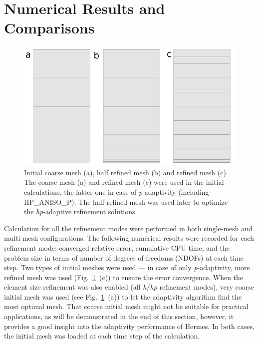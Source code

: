 \section{Numerical Results and Comparisons}\label{sec:results}

\begin{figure}[!ht]
  \begin{centering}
  \includegraphics[width=.8\columnwidth]{mesh}
  \caption{\label{fig:mesh} Initial coarse mesh (a),
  	half refined mesh (b) and refined mesh (c). The coarse mesh (a)
	and refined mesh (c) were used in the initial calculations, the latter one
	in case of \emph{p}-adaptivity (including HP\_ANISO\_P). The half-refined mesh was
	used later to optimize the \emph{hp}-adaptive refinement solutions.}
  \end{centering}
\end{figure}
Calculation for all the refinement modes were performed
in both single-mesh and multi-mesh configurations. 
The following numerical results were recorded for each 
refinement mode: converged relative error, cumulative CPU
time, and the problem size in terms of number
of degrees of freedoms (NDOFs) at each time step. 
Two types of initial meshes were used --- in case of only \emph{p}-adaptivity,
more refined mesh was used (Fig.~\ref{fig:mesh}~(c)) to ensure
the error convergence.
When the element size refinement
was also enabled (all \emph{h}/\emph{hp} refinement modes), very coarse initial mesh
was used (see Fig.~\ref{fig:mesh}~(a)) to let the adaptivity
algorithm find the most optimal mesh. That coarse initial mesh might not be
suitable for practical applications, as will be demonstrated in the
end of this section, however, it provides a good insight into the
adaptivity performance of Hermes.
In both cases, the initial mesh was loaded at each time step of the
calculation.

